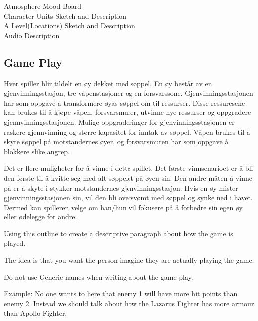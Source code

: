 Atmosphere Mood Board\\
Character  Units Sketch and Description\\
A Level(Locations) Sketch and Description\\
Audio Description

\subsection{Game Play}

Hver spiller blir tildelt en øy dekket med søppel. En øy består av en
gjenvinningsstasjon, tre våpenstasjoner og en forsvarssone.
Gjenvinningsstasjonen har som oppgave å transformere øyas søppel om til
ressurser. Disse ressuresene kan brukes til å kjøpe våpen,
forsvarsmurer, utvinne nye ressurser og oppgradere
gjennvinningsstasjonen. Mulige oppgraderinger for gjenvinningsstasjonen
er raskere gjennvinning og større kapasitet for inntak av søppel. Våpen
brukes til å skyte søppel på motstandernes øyer, og forsvarsmuren har
som oppgave å blokkere slike angrep. 

Det er flere muligheter for å vinne i dette spillet. Det første
vinnsenarioet er å bli den første til å kvitte seg med alt søppelet på
øyen sin. Den andre måten å vinne på er å skyte i stykker motstandernes
gjenvinningsstasjon. Hvis en øy mister gjenvinningsstasjonen sin, vil
den bli oversvømt med søppel og synke ned i havet. Dermed kan spilleren
velge om han/hun vil fokusere på å forbedre sin egen øy eller ødelegge
for andre. 

Using this outline to create a descriptive paragraph about how the game is played. 

The idea is that you want the person imagine they are actually playing the game.

Do not use Generic names when writing about the game play. 

Example: No one wants to here that enemy 1 will have more hit points than enemy 2. Instead we should talk about how the Lazarus Fighter has more armour than Apollo Fighter.


